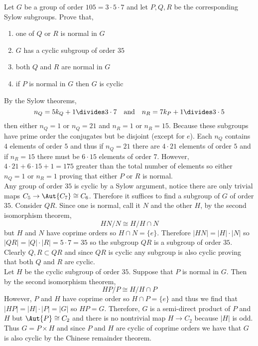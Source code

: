 \documentclass[12pt]{article}
\begin{document}
\begin{exercise}
Let $G$ be a group of order $105 = 3 \cdot 5 \cdot 7$ and let $P,Q,R$ be the corresponding Sylow subgroups. Prove that,
\begin{enumerate}
\item one of $Q$ or $R$ is normal in $G$
\item $G$ has a cyclic subgroup of order $35$
\item both $Q$ and $R$ are normal in $G$
\item if $P$ is normal in $G$ then $G$ is cyclic 
\end{enumerate}
\end{exercise} 

By the Sylow theorems,
\[ n_Q = 5 k_Q + 1 \divides 3 \cdot 7 \quad \text{and} \quad n_R = 7 k_P + 1 \divides 3 \cdot 5 \]
then either $n_Q = 1$ or $n_Q = 21$ and $n_R = 1$ or $n_R = 15$. Because these subgroups have prime order the conjugates but be disjoint (except for $e$). Each $n_Q$ contains $4$ elements of order $5$ and thus if $n_Q = 21$ there are $4 \cdot 21$ elements of order $5$ and if $n_R = 15$ there must be $6 \cdot 15$ elements of order $7$. However, $4 \cdot 21 + 6 \cdot 15 + 1 = 175$ greater than the total number of elements so either $n_Q = 1$ or $n_R = 1$ proving that either $P$ or $R$ is normal.
\bigskip\\
Any group of order $35$ is cyclic by a Sylow argument, notice there are only trivial maps $C_5 \to \Aut{C_7} \cong C_6$. Therefore it suffices to find a subgroup of $G$ of order $35$. Consider $QR$. Since one is normal, call it $N$ and the other $H$, by the second isomorphism theorem,
\[ HN / N \cong H / H \cap N \]
but $H$ and $N$ have coprime orders so $H \cap N = \{ e \}$. Therefore $|HN| = |H| \cdot |N|$ so $|QR| = |Q| \cdot |R| = 5 \cdot 7 = 35$ so the subgroup $QR$ is a subgroup of order $35$.
\bigskip\\
Clearly $Q,R \subset QR$ and since $QR$ is cyclic any subgroup is also cyclic proving that both $Q$ and $R$ are cyclic.
\bigskip\\
Let $H$ be the cyclic subgroup of order $35$. Suppose that $P$ is normal in $G$. Then by the second isomorphism theorem,
\[ HP/P \cong H / H \cap P \]
However, $P$ and $H$ have coprime order so $H \cap P = \{ e \}$ and thus we find that $|HP| = |H| \cdot |P| = |G|$ so $HP = G$. Therefore, $G$ is a semi-direct product of $P$ and $H$ but $\Aut{P} \cong C_2$ and there is no nontrivial map $H \to C_2$ because $|H|$ is odd. Thus $G = P \times H$ and since $P$ and $H$ are cyclic of coprime orders we have that $G$ is also cyclic by the Chinese remainder theorem.
\end{document}
